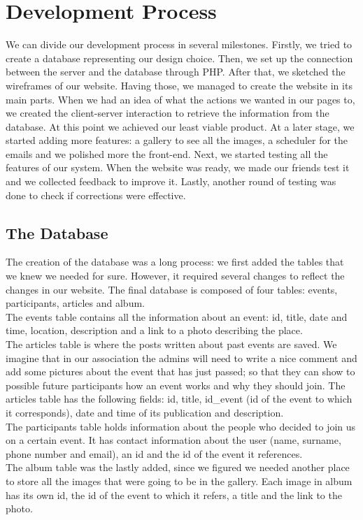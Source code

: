 \documentclass[a4paper]{article}
\begin{document}
	\section{Development Process}
	We can divide our development process in several milestones. Firstly, we tried to create a database representing our design choice. Then, we set up the connection between the server and the database through PHP. After that, we sketched the wireframes of our website. Having those, we managed to create the website in its main parts. When we had an idea of what the actions we wanted in our pages to, we created the client-server interaction to retrieve the information from the database. At this point we achieved our least viable product. At a later stage, we started adding more features: a gallery to see all the images, a scheduler for the emails and we polished more the front-end. Next, we started testing all the features of our system. When the website was ready, we made our friends test it and we collected feedback to improve it. Lastly, another round of testing was done to check if corrections were effective.
	
	\subsection{The Database}
	The creation of the database was a long process: we first added the tables that we knew we needed for sure. However, it required several changes to reflect the changes in our website. The final database is composed of four tables: events, participants, articles and album.\\
	The events table contains all the information about an event: id, title, date and time, location, description and a link to a photo describing the place.\\
	The articles table is where the posts written about past events are saved. We imagine that in our association the admins will need to write a nice comment and add some pictures about the event that has just passed; so that they can show to possible future participants how an event works and why they should join. The articles table has the following fields: id, title, id\_event (id of the event to which it corresponds), date and time of its publication and description.\\
	The participants table holds information about the people who decided to join us on a certain event. It has contact information about the user (name, surname, phone number and email), an id and the id of the event it references.\\
	The album table was the lastly added, since we figured we needed another place to store all the images that were going to be in the gallery. Each image in album has its own id, the id of the event to which it refers, a title and the link to the photo.
	
\end{document}
